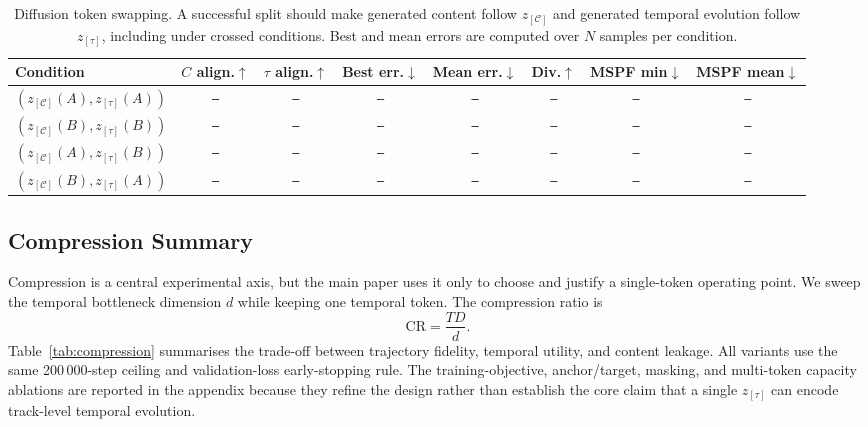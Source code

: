 \documentclass{article}
\newcommand{\zC}{z_{[\mathcal{C}]}}    %
\newcommand{\ztau}{z_{[\tau]}}          %
\newcommand{\res}{\texttt{--}}
\begin{document}
\begin{table}[t]
  \centering
  \setlength{\tabcolsep}{3.0pt}
  \caption{Diffusion token swapping.  A successful split should make
    generated content follow $\zC$ and generated temporal evolution
    follow $\ztau$, including under crossed conditions.  Best and mean
  errors are computed over $N$ samples per condition.}
  \label{tab:diffusion_swapping}
  \begin{tabular}{lccccccc}
    \toprule
    \textbf{Condition}
    & $C$ align.$\uparrow$
    & $\tau$ align.$\uparrow$
    & Best err.$\downarrow$
    & Mean err.$\downarrow$
    & Div.$\uparrow$
    & MSPF min$\downarrow$
    & MSPF mean$\downarrow$ \\
    \midrule
    $(\zC(A),\ztau(A))$ & \res & \res & \res & \res & \res & \res & \res \\
    $(\zC(B),\ztau(B))$ & \res & \res & \res & \res & \res & \res & \res \\
    $(\zC(A),\ztau(B))$ & \res & \res & \res & \res & \res & \res & \res \\
    $(\zC(B),\ztau(A))$ & \res & \res & \res & \res & \res & \res & \res \\
    \bottomrule
  \end{tabular}
\end{table}

\subsection{Compression Summary}
\label{ssec:exp_compression_summary}

Compression is a central experimental axis, but the main paper uses
it only to choose and justify a single-token operating point.  We
sweep the temporal bottleneck dimension $d$ while keeping one
temporal token.  The compression ratio is
%
\begin{equation}
  \mathrm{CR}=\frac{TD}{d}.
  \label{eq:compression_ratio}
\end{equation}
%
Table~\ref{tab:compression} summarises the trade-off between
trajectory fidelity, temporal utility, and content leakage.  All
variants use the same 200\,000-step ceiling and validation-loss
early-stopping rule.  The training-objective, anchor/target, masking,
and multi-token capacity ablations are reported in the appendix
because they refine the design rather than establish the core claim
that a single $\ztau$ can encode track-level temporal evolution.
\end{document}
